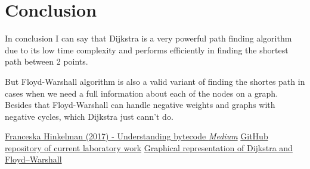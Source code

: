\documentclass[12pt]{article}
\begin{document}
\section*{Conclusion}

In conclusion I can say that Dijkstra is a very powerful path finding algorithm due to its low
time complexity and performs efficiently in finding the shortest path between 2 points.

But Floyd-Warshall algorithm is also a valid variant of finding the shortes path in cases when we need a 
full information about each of the nodes on a graph. Besides that Floyd-Warshall can handle negative weights
and graphs with negative cycles, which Dijkstra just cann't do.


\clearpage
\begin{thebibliography}{9}

   \href{https://medium.com/dailyjs/understanding-v8s-bytecode-317d46c94775}{Franceska
      Hinkelman (2017) - Understanding bytecode \emph{Medium}}
   \href{https://github.com/DdimaPos/AA-labs/tree/main/Lab4}{GitHub repository of current laboratory work}
   \href{https://dfs-bfs-visualization.vercel.app/}{Graphical representation of Dijkstra and Floyd–Warshall}
\end{thebibliography}
\end{document}
